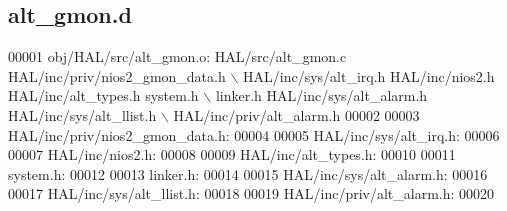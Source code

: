 \subsection{alt\+\_\+gmon.\+d}
\label{alt__gmon_8d_source}

\begin{DoxyCode}
00001 obj/HAL/src/alt\_gmon.o: HAL/src/alt\_gmon.c HAL/inc/priv/nios2\_gmon\_data.h \(\backslash\)
 HAL/inc/sys/alt_irq.h HAL/inc/nios2.h HAL/inc/alt\_types.h system.h \(\backslash\)
 linker.h HAL/inc/sys/alt_alarm.h HAL/inc/sys/alt_llist.h \(\backslash\)
 HAL/inc/priv/alt_alarm.h
00002 
00003 HAL/inc/priv/nios2\_gmon\_data.h:
00004 
00005 HAL/inc/sys/alt_irq.h:
00006 
00007 HAL/inc/nios2.h:
00008 
00009 HAL/inc/alt\_types.h:
00010 
00011 system.h:
00012 
00013 linker.h:
00014 
00015 HAL/inc/sys/alt_alarm.h:
00016 
00017 HAL/inc/sys/alt_llist.h:
00018 
00019 HAL/inc/priv/alt_alarm.h:
00020 \end{DoxyCode}
